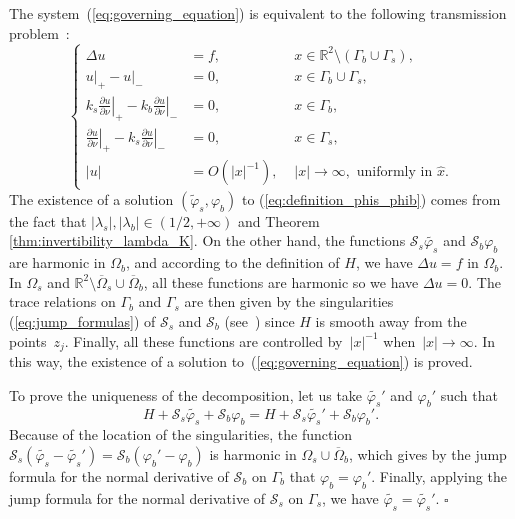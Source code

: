 \documentclass[final]{siamltex}
\numberwithin{equation}{section}
\numberwithin{figure}{section}
\numberwithin{table}{section}
\newcommand{\cqfd}{\hfill $\square$}
\begin{document}
\proof The system~(\ref{eq:governing_equation}) is equivalent to
the following transmission problem~\cite{allaire2007numerical}:
\begin{equation} \label{eqs210}
\left\{ \begin{alignedat}{2}\Delta u & ={f}, & \,\, x\in\mathbb{R}^{2}\setminus(\Gamma_{b}\cup\Gamma_{s}),\\
\left.u\right|_{+}-\left.u\right|_{-} & =0, & \,\, x\in\Gamma_{b}\cup\Gamma_{s},\\
k_{s}\left.\frac{\partial u}{\partial\nu}\right|_{+}-k_{b}\left.\frac{\partial u}{\partial\nu}\right|_{-} & =0,
& \,\, x\in\Gamma_{b},\\
\left.\frac{\partial u}{\partial\nu}\right|_{+}-k_{s}\left.\frac{\partial u}{\partial\nu}\right|_{-} & =0, &
\,\, x\in\Gamma_{s},\\
\left|u\right| & = {O}(\left|x\right|^{-1}), &
\,\,\left|x\right|\rightarrow\infty,\text{ uniformly in }\hat{x}.
\end{alignedat}
\right.
\end{equation}
The existence of a solution $(\tilde{\varphi}_s, \varphi_b)$ to
(\ref{eq:definition_phis_phib}) comes from the fact that
$|\lambda_s|, |\lambda_b|  \in (1/2, + \infty)$  and Theorem
\ref{thm:invertibility_lambda_K}. On the other hand, the functions
$\mathcal{S}_{s}\tilde{\varphi_{s}}$ and
$\mathcal{S}_{b}\varphi_{b}$ are harmonic in $\Omega_{b}$, and
according to the definition of $H$, we have $\Delta u= {f}$ in
$\Omega_{b}$. In $\Omega_{s}$ and
$\mathbb{R}^{2}\setminus\overline{\Omega}_{s}\cup
\overline{\Omega}_{b}$, all these functions are harmonic so we
have $\Delta u=0$. The trace relations on $\Gamma_b$ and
$\Gamma_s$ are then given by the singularities
(\ref{eq:jump_formulas}) of $\mathcal{S}_{s}$ and
$\mathcal{S}_{b}$ (see~\cite{ammari2007polarization}) since $H$ is
smooth away from the points~$z_{j}$. Finally, all these functions
are controlled by~$\left|x\right|^{-1}$
when~$\left|x\right|\rightarrow\infty$. In this way, the existence
of a solution to~(\ref{eq:governing_equation}) is proved.

To prove the uniqueness of the decomposition, let us take
$\tilde{\varphi_{s}}'$ and $\varphi_{b}'$ such that
\[
H+\mathcal{S}_{s}\tilde{\varphi_{s}}+\mathcal{S}_{b}\varphi_{b}=H+\mathcal{S}_{s}\tilde{\varphi_{s}}'+\mathcal{S}_{b}\varphi_{b}'.
\]
 Because of the location of the singularities, the function $\mathcal{S}_{s}(\tilde{\varphi_{s}}-\tilde{\varphi_{s}}')
 =\mathcal{S}_{b}(\varphi_{b}'-\varphi_{b})$
is harmonic in $\Omega_{s}\cup\overline{\Omega}_{b}$, which gives
by the jump formula for the normal derivative of $\mathcal{S}_{b}$
on $\Gamma_b$ that $\varphi_{b}=\varphi_{b}'$. Finally, applying
the jump formula for the normal derivative of $\mathcal{S}_{s}$ on
$\Gamma_s$, we have $\tilde{\varphi_{s}}=\tilde{\varphi_{s}}'$.
\cqfd
\end{document}

